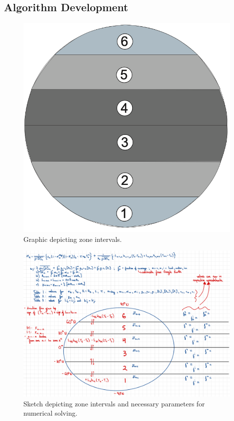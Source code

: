 \documentclass{article}
\begin{document}
\begin{appendices}
\subsection{Algorithm Development}
\begin{figure}[h]
    \centering
    \includegraphics[scale=0.3]{zones.png}
    \caption{Graphic depicting zone intervals.}
    \label{fig:zones}
\end{figure}
\FloatBarrier

\begin{figure}[h]
    \centering
    \includegraphics[scale=0.3]{Graphicalg.pdf}
    \caption{Sketch depicting zone intervals and necessary parameters for numerical solving.}
    \label{fig:graphicalg}
\end{figure}
\FloatBarrier


\end{appendices}
\end{document}
